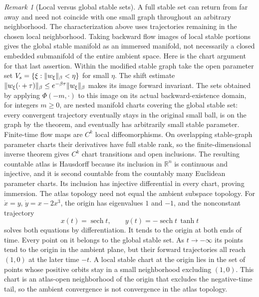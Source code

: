 \documentclass[11pt,oneside]{book}
\theoremstyle{definition}
\theoremstyle{remark}\newtheorem{remark}[theorem]{Remark}
\newcommand{\R}{\mathbb R}\newcommand{\C}{\mathbb C}
\begin{document}
\begin{remark}[Local versus global stable sets]\label{d13:20:local-global}
A full stable set can return from far away and need not coincide with
one small graph throughout an arbitrary neighborhood. The characterization
above uses trajectories remaining in the chosen local neighborhood.
Taking backward flow images of local stable portions gives the global
stable manifold as an immersed manifold, not necessarily a closed
embedded submanifold of the entire ambient space.
Here is the chart argument for that last assertion. Within the modified
stable graph take the open parameter set
$V_s=\{\xi:\lVert w_\xi\rVert_\beta<\eta\}$ for small $\eta$.
The shift estimate
$\lVert w_\xi(\cdot+\tau)\rVert_\beta\leq e^{-\beta\tau}\lVert w_\xi\rVert_\beta$
makes its image forward invariant. The sets obtained by applying
$\Phi(-m,\cdot)$ to this image on its actual backward-existence domain,
for integers $m\geq0$, are nested
manifold charts covering the global stable set: every convergent
trajectory eventually stays in the original small ball, is on the graph
by the theorem, and eventually has arbitrarily small stable parameter.
Finite-time flow maps are $C^k$ local diffeomorphisms. On overlapping
stable-graph parameter charts their derivatives have full stable rank,
so the finite-dimensional inverse theorem gives $C^k$ chart transitions
and open inclusions. The resulting countable atlas is Hausdorff because
its inclusion in $\R^n$ is continuous and injective, and it is second
countable from the countably many Euclidean parameter charts. Its
inclusion has injective differential in every chart, proving immersion.
The atlas topology need not equal the ambient subspace topology.
For $\dot x=y$, $\dot y=x-2x^3$, the origin has eigenvalues $1$ and
$-1$, and the nonconstant trajectory
\[
 x(t)=\operatorname{sech}t,\qquad
 y(t)=-\operatorname{sech}t\,\tanh t
\]
solves both equations by differentiation. It tends to the origin at
both ends of time. Every point on it belongs to the global stable set.
As $t\to-\infty$ its points tend to the origin in the ambient plane,
but their forward trajectories all reach $(1,0)$ at the later time
$-t$. A local stable chart at the origin lies in the set of points
whose positive orbits stay in a small neighborhood excluding $(1,0)$.
This chart is an atlas-open neighborhood of the origin that excludes
the negative-time tail, so the ambient convergence is not convergence
in the atlas topology.
\end{remark}
\end{document}
